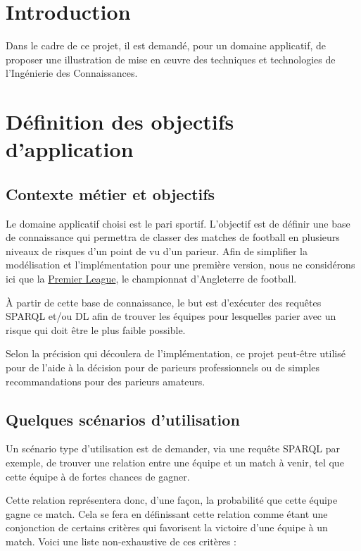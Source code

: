 \documentclass[oneside,13pt,a4paper]{article}
\begin{document}
\section{Introduction}

Dans le cadre de ce projet, il est demandé, pour un domaine applicatif, de proposer une illustration de mise en œuvre des techniques et technologies de l’Ingénierie des Connaissances.

\section {Définition des objectifs d'application}

\subsection{Contexte métier et objectifs}

Le domaine applicatif choisi est le pari sportif. L'objectif est de définir une base de connaissance qui permettra de classer des matches de football en plusieurs niveaux de risques d'un point de vu d'un parieur. Afin de simplifier la modélisation et l’implémentation pour une première version, nous ne considérons ici que la \href{https://fr.wikipedia.org/wiki/Championnat_d%27Angleterre_de_football}{Premier League}, le championnat d'Angleterre de football.

À partir de cette base de connaissance, le but est d'exécuter des requêtes SPARQL et/ou DL afin de trouver les équipes pour lesquelles parier avec un risque qui doit être le plus faible possible.

Selon la précision qui découlera de l'implémentation, ce projet peut-être utilisé pour de l'aide à la décision pour de parieurs professionnels ou de simples recommandations pour des parieurs amateurs.

\subsection{Quelques scénarios d'utilisation}
\label{scenario}

Un scénario type d'utilisation est de demander, via une requête SPARQL par exemple, de trouver une relation entre une équipe et un match à venir, tel que cette équipe à de fortes chances de gagner.

Cette relation représentera donc, d'une façon, la probabilité que cette équipe gagne ce match. Cela se fera en définissant cette relation comme étant une conjonction de certains critères qui favorisent la victoire d'une équipe à un match. Voici une liste non-exhaustive de ces critères : 
\end{document}
